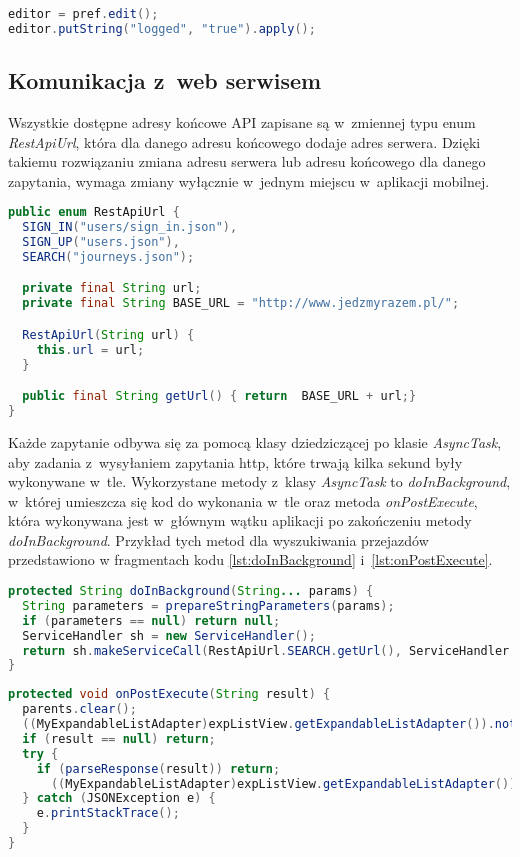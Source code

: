 \documentclass[eng,archivemode]{mgr}
\begin{document}
\begin{lstlisting}[language=java, caption={Ustawienie zmiennej "logged" na true po udanym logowaniu lub rejestracji}]
editor = pref.edit();
editor.putString("logged", "true").apply();
\end{lstlisting}

\subsection{Komunikacja z~web serwisem}
Wszystkie dostępne adresy końcowe API zapisane są w~zmiennej typu enum \newline \textit{RestApiUrl}, która dla danego adresu końcowego dodaje adres serwera. Dzięki takiemu rozwiązaniu zmiana adresu serwera lub adresu końcowego dla danego zapytania, wymaga zmiany wyłącznie w~jednym miejscu w~aplikacji mobilnej.

\begin{lstlisting}[language=java, caption={Zmienna enum, zwracająca pełny adres dla zapytania do API}]
public enum RestApiUrl {
  SIGN_IN("users/sign_in.json"),
  SIGN_UP("users.json"),
  SEARCH("journeys.json");

  private final String url;
  private final String BASE_URL = "http://www.jedzmyrazem.pl/";

  RestApiUrl(String url) {
    this.url = url;
  }

  public final String getUrl() { return  BASE_URL + url;}
}
\end{lstlisting}


Każde zapytanie odbywa się za pomocą klasy dziedziczącej po klasie \textit{AsyncTask}, aby zadania z~wysyłaniem zapytania http, które trwają kilka sekund były wykonywane w~tle. Wykorzystane metody z~klasy \textit{AsyncTask} to \textit{doInBackground}, w~której umieszcza się kod do wykonania w~tle oraz metoda \textit{onPostExecute}, która wykonywana jest w~głównym wątku aplikacji po zakończeniu metody \textit{doInBackground}. Przykład tych metod dla wyszukiwania przejazdów przedstawiono w fragmentach kodu \ref{lst:doInBackground} i~\ref{lst:onPostExecute}.

\begin{lstlisting}[language=java, caption={Metoda "doInBackground" dla wyszukiwania połączeń}, label=lst:doInBackground]
protected String doInBackground(String... params) {
  String parameters = prepareStringParameters(params);
  if (parameters == null) return null;
  ServiceHandler sh = new ServiceHandler();
  return sh.makeServiceCall(RestApiUrl.SEARCH.getUrl(), ServiceHandler.GET, null, parameters);
}
\end{lstlisting}
\newpage
\begin{lstlisting}[language=java, caption={Metoda "onPostExecute" dla wyszukiwania połączeń}, label=lst:onPostExecute]
protected void onPostExecute(String result) {
  parents.clear();
  ((MyExpandableListAdapter)expListView.getExpandableListAdapter()).notifyDataSetChanged();
  if (result == null) return;
  try {
    if (parseResponse(result)) return;
      ((MyExpandableListAdapter)expListView.getExpandableListAdapter()).notifyDataSetChanged();
  } catch (JSONException e) {
    e.printStackTrace();
  }
}
\end{lstlisting}
\end{document}
